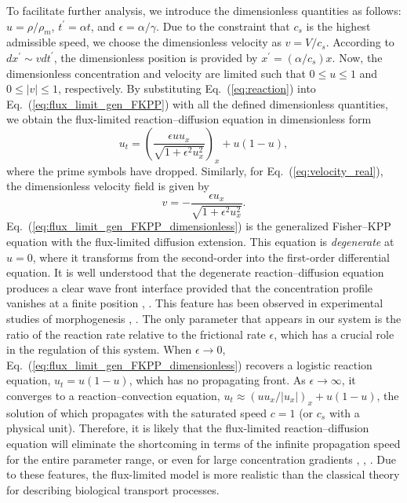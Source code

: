 \documentclass[jkps,preprint,fleqn,showpacs,showkeys]{revtex4}
\newcommand{\eq}[1]{Eq.~(\ref{#1})}
\begin{document}
To facilitate further analysis, we introduce the dimensionless quantities as follows: $u = \rho/\rho_m$, $t^\prime = \alpha t$, and $\epsilon = \alpha/\gamma$. Due to the constraint that $c_s$ is the highest admissible speed, we choose the dimensionless velocity as $v = V/c_s$. According to $dx^\prime \sim v dt^\prime$, the dimensionless position is provided by $x^\prime = (\alpha/c_s) x$. Now, the dimensionless concentration and velocity are limited such that $0 \leq u \leq 1$ and $0 \leq |v| \leq 1$, respectively. By substituting \eq{eq:reaction} into \eq{eq:flux_limit_gen_FKPP} with all the defined dimensionless quantities, we obtain the flux-limited reaction--diffusion equation in dimensionless form 
\begin{equation}\label{eq:flux_limit_gen_FKPP_dimensionless}
u_t = \left(\frac{\epsilon u u_x}{\sqrt{1+\epsilon^2 u_x^2}}\right)_x + u\left(1-u\right),
\end{equation}
where the prime symbols have dropped. Similarly, for \eq{eq:velocity_real}, the dimensionless velocity field is given by
\begin{equation}\label{eq:velocity_dimensionless}
v = -\frac{\epsilon u_x}{\sqrt{1+\epsilon^2 u_x^2}}.
\end{equation}
\eq{eq:flux_limit_gen_FKPP_dimensionless} is the generalized Fisher--KPP equation \cite{Newman1980} with the flux-limited diffusion extension. This equation is \emph{degenerate} at $u=0$, where it transforms from the second-order into the first-order differential equation. It is well understood that the degenerate reaction--diffusion equation produces a clear wave front interface provided that the concentration profile vanishes at a finite position \cite{Newman1980}, \cite{Murray1989}. This feature has been observed in experimental studies of morphogenesis \cite{Verbeni2013morphogenetic}, \cite{Sanchez2015modeling}. The only parameter that appears in our system is the ratio of the reaction rate relative to the frictional rate $\epsilon$, which has a crucial role in the regulation of this system. When $\epsilon \to 0$, \eq{eq:flux_limit_gen_FKPP_dimensionless} recovers a logistic reaction equation, $u_t = u\left(1-u\right)$, which has no propagating front. As $\epsilon\to\infty$, it converges to a reaction--convection equation, $u_t \approx (u u_x/|u_x|)_x + u\left(1-u\right)$, the solution of which propagates with the saturated speed $c=1$ (or $c_s$ with a physical unit). Therefore, it is likely that the flux-limited reaction--diffusion equation will eliminate the shortcoming in terms of the infinite propagation speed for the entire parameter range, or even for large concentration gradients \cite{Andreu2010AFisher}, \cite{Campos2013ontheanalysis}, \cite{Calvo2016pattern}. Due to these features, the flux-limited model is more realistic than the classical theory for describing biological transport processes.
\end{document}
